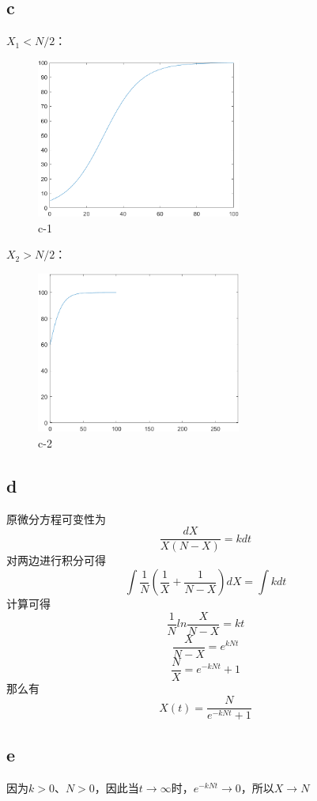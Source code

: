 \documentclass{article}
\begin{document}
\subsection{c}
$X_1 < N / 2$：
\begin{figure}[!h]
    \centering
    \includegraphics[width=0.6\textwidth]{pic/hw10_04.png}
    \caption{c-1}
\end{figure}

$X_2 > N / 2$：
\begin{figure}[!h]
    \centering
    \includegraphics[width=0.6\textwidth]{pic/hw10_03.png}
    \caption{c-2}
\end{figure}

\newpage

\subsection{d}
原微分方程可变性为
\[\frac{dX}{X(N-X)} = kdt\]
对两边进行积分可得
\[\int \frac{1}{N}\left( \frac{1}{X} + \frac{1}{N-X} \right)dX = \int kdt\]
计算可得
\[\frac{1}{N} ln\frac{X}{N-X} = kt\]
\[\frac{X}{N-X} = e^{kNt}\]
\[\frac{N}{X} = e^{-kNt} + 1\]
那么有
\[X(t) = \frac{N}{e^{-kNt} + 1}\]

\subsection{e}
因为$k>0$、$N>0$，因此当$t \rightarrow \infty$时，$e^{-kNt}\rightarrow0 $，所以$X \rightarrow N$
\end{document}
